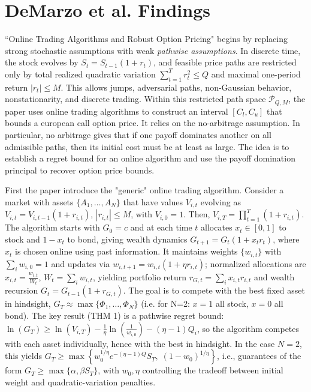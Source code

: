 \documentclass[12pt]{article}
\begin{document}
\section*{DeMarzo et al. Findings}
``Online Trading Algorithms and Robust Option Pricing" begins by replacing strong stochastic assumptions with weak \emph{pathwise assumptions}. In discrete time, the stock evolves by $S_t = S_{t-1}(1 + r_t)$, and feasible price paths are restricted only by total realized quadratic variation $\sum_{t=1}^T r_t^2 \le Q$ and maximal one-period return $|r_t| \le M$. This allows jumps, adversarial paths, non-Gaussian behavior, nonstationarity, and discrete trading. Within this restricted path space $\mathcal{P}_{Q,M}$, the paper uses online trading algorithms to construct an interval $[C_l, C_u]$ that bounds a european call option price. It relies on the no-arbitrage assumption. In particular, no arbitrage gives that if one payoff dominates another on all admissible paths, then its initial cost must be at least as large. The idea is to establish a regret bound for an online algorithm and use the payoff domination principal to recover option price bounds. 

First the paper introduce the "generic" online trading algorithm. Consider a market with assets $\{A_1,\dots,A_N\}$ that have values $V_{i,t}$ evolving as $V_{i,t} = V_{i,t-1}(1 + r_{i,t})$, $|r_{i,t}|\le M$, with $V_{i,0}=1$. Then, $V_{i,T} = \prod_{t=1}^T (1+r_{i,t})$. The algorithm starts with $G_0 = c$ and at each time $t$ allocates $x_t \in [0,1]$ to stock and $1-x_t$ to bond, giving wealth dynamics $G_{t+1} = G_t(1 + x_t r_t)$, where $x_t$ is chosen online using past information. It maintains weights $\{w_{i,t}\}$ with $\sum_i w_{i,0}=1$ and updates via $w_{i,t+1} = w_{i,t}(1 + \eta r_{i,t})$; normalized allocations are $x_{i,t} = \frac{w_{i,t}}{W_t}$, $W_t = \sum_i w_{i,t}$, yielding portfolio return $r_{G,t} = \sum_i x_{i,t} r_{i,t}$ and wealth recursion $G_t = G_{t-1}(1 + r_{G,t})$. The goal is to compete with the best fixed asset in hindsight, $G_T \approx \max\{\Phi_1,\dots,\Phi_N\}$ (i.e. for N=2: $x=1$ all stock, $x=0$ all bond). The key result (THM 1) is a pathwise regret bound: $\ln(G_T) \ge \ln(V_{i,T}) - \frac{1}{\eta}\ln\!\left(\frac{1}{w_{i,0}}\right) - (\eta-1)Q_i$, so the algorithm competes with each asset individually, hence with the best in hindsight. In the case $N=2$, this yields $G_T \ge \max\left\{ w_0^{1/\eta} e^{-(\eta-1)Q} S_T,\; (1-w_0)^{1/\eta} \right\}$, i.e., guarantees of the form $G_T \ge \max\{\alpha, \beta S_T\}$, with $w_0,\eta$ controlling the tradeoff between initial weight and quadratic-variation penalties.
\end{document}
